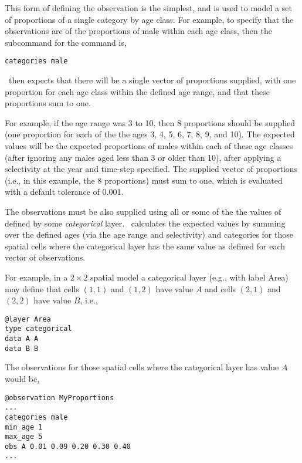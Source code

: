 This form of defining the observation is the simplest, and is used to model a set of proportions of a single category by age class. For example, to specify that the observations are of the proportions of male within each age class, then the subcommand  for the  command is,

{\small{\begin{verbatim}
categories male
\end{verbatim}}}

\SPM\ then expects that there will be a single vector of proportions supplied, with one proportion for each age class within the defined age range, and that these proportions sum to one. 

For example, if the age range was 3 to 10, then 8 proportions should be supplied (one proportion for each of the the ages 3, 4, 5, 6, 7, 8, 9, and 10). The expected values will be the expected proportions of males within each of these age classes (after ignoring any males aged less than 3 or older than 10), after applying a selectivity at the year and time-step specified. The supplied vector of proportions (i.e., in this example, the 8 proportions) must sum to one, which is evaluated with a default tolerance of 0.001. 

The observations must be also supplied using all or some of the the values of defined by some \emph{categorical} layer. \SPM\ calculates the expected values by summing over the defined ages (via the age range and selectivity) and categories for those spatial cells where the categorical layer has the same value as defined for each vector of observations.

For example, in a $2 \times 2$ spatial model a categorical layer (e.g., with label Area) may define that cells $(1,1)$ and $(1,2)$ have value $A$ and cells $(2,1)$ and $(2,2)$ have value $B$, i.e.,

{\small{\begin{verbatim}
@layer Area
type categorical
data A A 
data B B
\end{verbatim}}}

The observations for those spatial cells where the categorical layer has value $A$ would be, 

{\small{\begin{verbatim}
@observation MyProportions
...
categories male
min_age 1
max_age 5
obs A 0.01 0.09 0.20 0.30 0.40
...
\end{verbatim}}}

